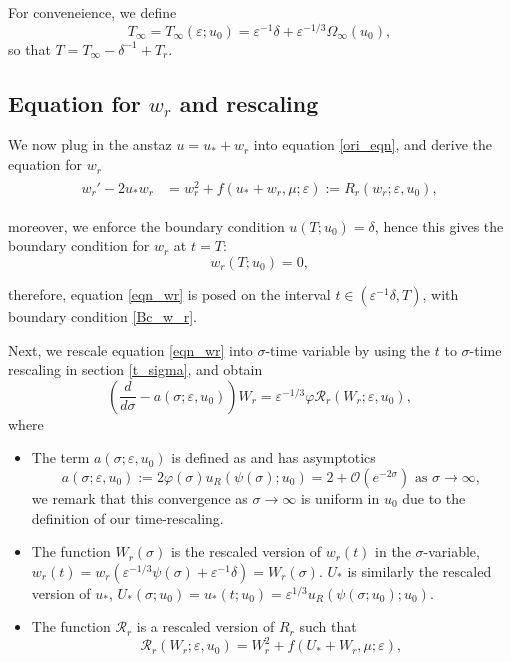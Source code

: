 \documentclass[letterpaper,11pt]{article}
\newcommand{\Ral}{\mathcal{R}}
\newcommand{\rmO}{\mathcal{O}}
\newcommand{\eps}{\varepsilon}
\numberwithin{equation}{section}
\theoremstyle{plain}
\begin{document}
For conveneience, we define \[
T_\infty = T_\infty(\eps; u_0)= \eps^{-1}\delta + \eps^{-1/3}\Omega_\infty(u_0),
\]
so that $T = T_\infty - \delta^{-1} + T_r$.

\subsection{Equation for \texorpdfstring{$w_r$}{wr} and rescaling}\label{equation_wr}
We now plug in the anstaz $u = u_* + w_r$ into equation \eqref{ori_eqn}, and derive the equation for $w_r$
\begin{align}\label{eqn_wr}
\begin{split}
w_r' - 2u_*w_r &= w_r^2 + f(u_*+w_r, \mu; \eps) := R_r(w_r; \eps,u_0),
\end{split}
\end{align}

moreover, we enforce the boundary condition $u(T; u_0) = \delta$, hence this gives the boundary condition for $w_r$ at $t=T$:
\begin{equation}\label{Bc_w_r}
w_r(T;u_0) = 0,
\end{equation}


therefore, equation \eqref{eqn_wr} is posed on the interval $t \in (\eps^{-1}\delta, T)$, with boundary condition \eqref{Bc_w_r}.

Next, we rescale equation \eqref{eqn_wr} into $\sigma$-time variable by using the $t$ to $\sigma$-time rescaling in section \ref{t_sigma}, and obtain
\begin{equation}\label{rescl_wr}
\left(\frac{d}{d\sigma} - a(\sigma; \eps, u_0)\right) W_r =\eps^{-1/3}\varphi \mathcal{R}_r(W_r; \eps,u_0),
\end{equation}
where
\begin{itemize}
\item The term $a(\sigma;\eps, u_0)$ is defined as and has asymptotics
\[
a(\sigma; \eps, u_0) := 2\varphi(\sigma)u_R(\psi(\sigma); u_0) =  2+\rmO(e^{-2\sigma}) \text{ as }\sigma \to \infty,
\]
we remark that this convergence as $\sigma \to \infty$ is uniform in $u_0$ due to the definition of our time-rescaling.

\item The function $W_r(\sigma)$ is the rescaled version of $w_r(t)$ in the $\sigma$-variable, $w_r(t) = w_r(\eps^{-1/3}\psi(\sigma)+\eps^{-1}\delta) = W_r(\sigma)$. $U_*$ is similarly the rescaled version of $u_*$,  $U_*(\sigma;u_0)= u_*(t;u_0) = \eps^{1/3}u_R(\psi(\sigma;u_0);u_0)$.

\item The function $\Ral_r$ is a rescaled version of $R_r$ such that 
\[
\mathcal{R}_r(W_r;\eps,u_0) = W_r^2 + f(U_*+W_r, \mu ; \eps),
\]
\end{itemize}
 
\end{document}
